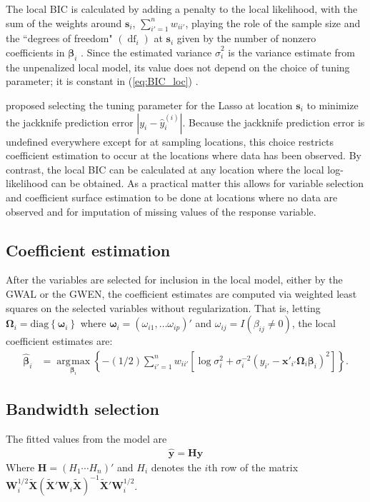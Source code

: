 \documentclass[authoryear, review, 11pt]{elsarticle}
\DeclareMathOperator*{\argmax}{\arg\!\max}
\DeclareMathOperator*{\df}{\mbox{df}}
\begin{document}
	 The local BIC is calculated by adding a penalty to the local likelihood, with the sum of the weights around $\bm{s}_i$, $\sum_{i'=1}^n w_{ii'}$, playing the role of the sample size and the ``degrees of freedom" $\left( \df_i \right)$ at $\bm{s}_i$ given by the number of nonzero coefficients in $\bm{\beta}_i$ \citep{Zou:2007}. Since the estimated variance $\hat{\sigma}_i^2$ is the variance estimate from the unpenalized local model, its value does not depend on the choice of tuning parameter; it is constant in (\ref{eq:BIC_loc}) \citep{Zou:2007}.
	
	\cite{Wheeler:2009} proposed selecting the tuning parameter for the Lasso at location $\bm{s}_i$ to minimize the jackknife prediction error $|y_i - \hat{y}_i^{(i)}|$. Because the jackknife prediction error is undefined everywhere except for at sampling locations, this choice restricts coefficient estimation to occur at the locations where data has been observed. By contrast, the local BIC can be calculated at any location where the local log-likelihood can be obtained. As a practical matter this allows for variable selection and coefficient surface estimation to be done at locations where no data are observed and for imputation of missing values of the response variable.
	
	\subsection{Coefficient estimation}
	After the variables are selected for inclusion in the local model, either by the GWAL or the GWEN, the coefficient estimates are computed via weighted least squares on the selected variables without regularization. That is, letting $\bm{\Omega}_i = \text{diag}\left\{\bm{\omega}_i\right\}$ where $\bm{\omega}_i = \left(\omega_{i1}, \dots \omega_{ip}\right)'$ and $\omega_{ij}= I \left(\beta_{ij} \neq 0\right)$, the local coefficient estimates are:
	\begin{align} \label{eq:coefficients}
		\hat{\bm{\beta}}_i &= \argmax \limits_{\bm{\beta}_i} \left\{-(1/2) \sum_{i'=1}^n w_{ii'} \left[ \log{\sigma^2_i}  + \sigma^{-2}_i  \left(y_{i'} - \bm{x}'_{i'} \bm{\Omega}_i \bm{\beta}_i \right)^2 \right]\right\}.
	\end{align}
	
	 
	\subsection{Bandwidth selection}
		The fitted values from the model are	
	\begin{align}
		\hat{\bm{y}} = \bm{H} \bm{y}
	\end{align}
	Where $\bm{H} = \left(H_1 \cdots H_n \right)'$ and $H_i$ denotes the $i$th row of the matrix $\bm{W}_i^{1/2} \tilde{\bm{X}} \left( \tilde{\bm{X}}'\bm{W}_i \tilde{\bm{X}} \right)^{-1} \tilde{\bm{X}}'\bm{W}_i^{1/2}$.
	
\end{document}
